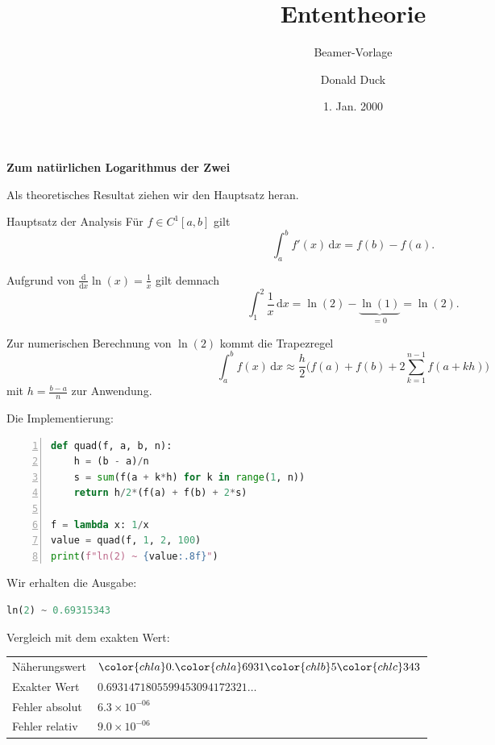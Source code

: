\documentclass[8pt]{beamer}
\title{Ententheorie}
\subtitle{Beamer-Vorlage}
\date{1. Jan. 2000}
\author{Donald Duck}
\newcommand{\hla}[1]{{\color{chla}#1}}
\newcommand{\hlb}[1]{{\color{chlb}#1}}
\newcommand{\hlc}[1]{{\color{chlc}#1}}
\newcommand{\strong}[1]{\textsf{\textbf{#1}}}
\newcommand{\centerheadline}[1]{%
  \begin{center}\strong{#1}\end{center}}
\newcommand{\parspace}{\vspace{0.8em}}
\begin{document}
\begin{frame}
\maketitle
\end{frame}

\begin{frame}
\centerheadline{Zum natürlichen Logarithmus der Zwei}
\end{frame}

\begin{frame}
Als theoretisches Resultat ziehen wir den Hauptsatz heran.

\begin{block}{Hauptsatz der Analysis}
Für $f\in C^1[a,b]$ gilt
\[\int_a^b f'(x)\,\mathrm dx = f(b) - f(a).\]
\end{block}\pause

Aufgrund von $\frac{\mathrm d}{\mathrm dx}\ln(x) = \frac{1}{x}$ gilt demnach
\[\int_1^2 \frac{1}{x}\,\mathrm dx
= \ln(2) - \underbrace{\ln(1)}_{=0} = \ln(2).\]
\end{frame}

\begin{frame}[t,fragile]
\vspace{2em}

Zur numerischen Berechnung von $\ln(2)$ kommt die Trapezregel
\[\int_a^b f(x)\,\mathrm dx\approx
\frac{h}{2}\bigg(f(a) + f(b) + 2\sum_{k=1}^{n-1}f(a + kh)\bigg)\]
mit $h = \frac{b-a}{n}$ zur Anwendung.\pause

\parspace
Die Implementierung:

\begin{lstlisting}[language=python,xleftmargin=4em,
numbers=left,firstnumber=1]
def quad(f, a, b, n):
    h = (b - a)/n
    s = sum(f(a + k*h) for k in range(1, n))
    return h/2*(f(a) + f(b) + 2*s)

f = lambda x: 1/x
value = quad(f, 1, 2, 100)
print(f"ln(2) ~ {value:.8f}")
\end{lstlisting}

Wir erhalten die Ausgabe:

\begin{lstlisting}[language=python,xleftmargin=4em]
ln(2) ~ 0.69315343
\end{lstlisting}
\end{frame}

\begin{frame}
Vergleich mit dem exakten Wert:

\begin{table}
\begin{tabular}{ll}
\toprule
Näherungswert & $\hla{0}.\hla{6931}\hlb{5}\hlc{343}$\\
Exakter Wert  & $0.6931471805599453094172321\ldots$\\
\midrule[\heavyrulewidth]
Fehler absolut & $6.3\times 10^{-06}$\\
Fehler relativ & $9.0\times 10^{-06}$\\
\bottomrule
\end{tabular}
\end{table}
\end{frame}
\end{document}
